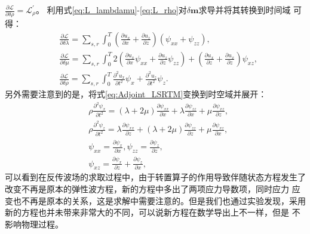 $\frac{\partial\mathcal{L}}{\partial\delta\rho}=\mathcal{L}^{'}_{\rho}$。
利用式\ref{eq:L_lambdamu}-\ref{eq:L_rho}对$\delta\mathbf{m}$求导并将其转换到时间域
可得：
\begin{equation}
\begin{split}
   & \frac{\partial\mathcal{L}}{\partial \delta\lambda}=\sum_{s,r}\int^T_{0}
	(\frac{\partial u_x}{\partial x}+\frac{\partial u_z}{\partial z})(\psi_{xx}+\psi_{zz}),\\
   & \frac{\partial\mathcal{L}}{\partial \delta\mu}=\sum_{s,r}\int^T_{0}
	2(\frac{\partial u_x}{\partial x}\psi_{xx}+\frac{\partial u_z}{\partial z}\psi_{zz})+
	(\frac{\partial u_x}{\partial z}+\frac{\partial u_x}{\partial z})\psi_{xz},\\
   & \frac{\partial\mathcal{L}}{\partial \delta\rho}=\sum_{s,r}\int^T_{0}
	\frac{\partial^2 u_x}{\partial t^2}\psi_x+\frac{\partial^2 u_z}{\partial t^2}\psi_{z}.
    \label{eq:Gradient_lambdamurho_LSRTM}
\end{split}
\end{equation}
另外需要注意到的是，将式\ref{eq:Adjoint_LSRTM}变换到时空域并展开：
\begin{equation}
\begin{split}
   & \rho\frac{\partial^2 \psi_{x}}{\partial t^2}=	(\lambda+2\mu)\frac{\partial \psi_{xx}}{\partial x}+
		\lambda\frac{\partial \psi_{zz}}{\partial x}+\mu\frac{\partial \psi_{xz}}{\partial z},\\
   & \rho\frac{\partial^2 \psi_{z}}{\partial t^2}=	\lambda\frac{\partial \psi_{xx}}{\partial z}+
		(\lambda+2\mu)\frac{\partial \psi_{zz}}{\partial z}+\mu\frac{\partial \psi_{xz}}{\partial x},\\
   & \psi_{xx}=\frac{\partial \psi_x}{\partial x}, \psi_{zz}=\frac{\partial \psi_z}{\partial z},\\
   & \psi_{xz}=\frac{\partial \psi_x}{\partial z} + \frac{\partial \psi_z}{\partial x},
    \label{eq:Time_Adjoint_WE_LSRTM}
\end{split}
\end{equation}
可以看到在反传波场的求取过程中，由于转置算子的作用导致伴随状态方程发生了改变不再是原本的弹性波方程，新的方程中多出了两项应力导数项，同时应力
应变也不再是原本的关系，这是求解中需要注意的。但是我们也通过实验发现，采用新的方程也并未带来非常大的不同，可以说新方程在数学导出上不一样，但是
不影响物理过程。
